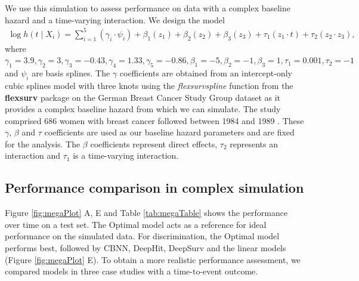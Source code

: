 \documentclass[preprint,12pt,authoryear]{elsarticle}
\begin{document}
We use this simulation to assess performance on data with a complex baseline hazard and a time-varying interaction. We design the model \begin{align}
\log h(t \mid X_i) =\sum_{i=1}^{5} (\gamma_{i} \cdot \psi_{i}) + \beta_{{1}} (z_{1}) + \beta_{{2}} (z_{2})+ \beta_{{3}} (z_{3})+ \tau_{1} ( z_{1} \cdot t)+ \tau_{2} (z_{2} \cdot z_{3}), \nonumber
\end{align} where
\(\gamma_{1}=3.9, \gamma_{2}=3, \gamma_{3}=-0.43, \gamma_{4}=1.33,\gamma_{5}=-0.86, \beta_{{1}}=-5, \beta_{{2}}=-1, \beta_{{3}}=1, \tau_{1}=0.001, \tau_{2}=-1\)
and \(\psi_{i}\) are basis splines. The \(\gamma\) coefficients are obtained from an intercept-only cubic splines model with three knots using the \emph{flexsurvspline}
function from the \textbf{flexsurv} package \citep{flexsurv} on the German Breast Cancer Study Group dataset as it provides a complex baseline hazard from which
we can simulate. The study comprised 686 women with breast cancer followed between 1984 and 1989 \citep{royston2002flexible}. These $\gamma$, $\beta$ and $\tau$ coefficients are used
as our baseline hazard parameters and are fixed for the analysis. The \(\beta\) coefficients represent direct effects, \(\tau_{2}\) represents an interaction and
\(\tau_{1}\) is a time-varying interaction.

\hypertarget{performance-comparison-in-complex-simulation}{%
\subsection{Performance comparison in complex
simulation}\label{performance-comparison-in-complex-simulation}}


Figure \ref{fig:megaPlot} A, E and Table \ref{tab:megaTable} shows the performance over time on a test set. The Optimal model acts as a reference for ideal performance on the simulated data. For discrimination, the Optimal model performs best,
followed by CBNN, DeepHit, DeepSurv and the linear models (Figure \ref{fig:megaPlot} E). To obtain a more realistic performance assessment, we compared
models in three case studies with a time-to-event outcome.
\end{document}
